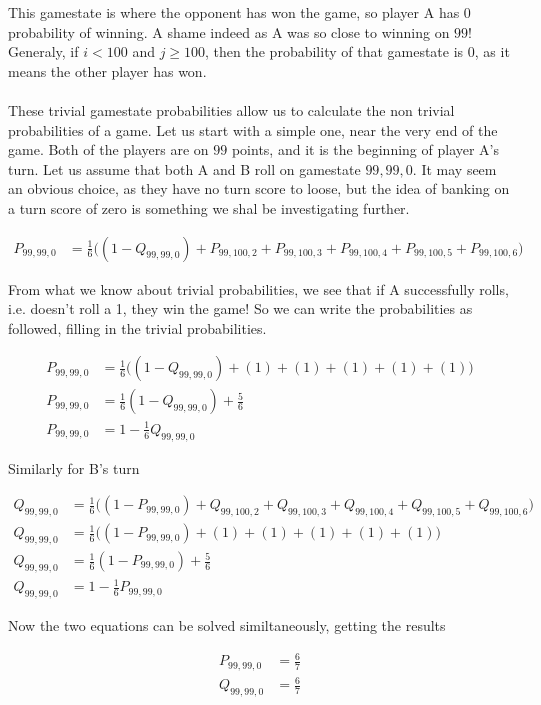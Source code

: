 \documentclass[a4paper,titlepage]{article}
\begin{document}
This gamestate is where the opponent has won the game, so player A has 0 probability of winning. A shame indeed as A was so close to winning on $99$!
Generaly, if $i<100$ and $j\geq100$, then the probability of that gamestate is $0$, as it means the other player has won.
\\
\\
These trivial gamestate probabilities allow us to calculate the non trivial probabilities of a game.
Let us start with a simple one, near the very end of the game. Both of the players are on $99$ points, and it is the beginning of player A's turn.
Let us assume that both A and B roll on gamestate $99,99,0$.
It may seem an obvious choice, as they have no turn score to loose, but the idea of banking on a turn score of zero is something we shal be investigating further.

\begin{align*}
	P_{99,99,0} &= \frac{1}{6}\bigg((1 - Q_{99,99,0}) + P_{99,100,2} + P_{99,100,3} + P_{99,100,4} + P_{99,100,5} + P_{99,100,6}\bigg)
\end{align*}

From what we know about trivial probabilities, we see that if A successfully rolls, i.e. doesn't roll a 1, they win the game!
So we can write the probabilities as followed, filling in the trivial probabilities.

\begin{align*}
	P_{99,99,0} &= \frac{1}{6}\bigg((1 - Q_{99,99,0}) + (1) + (1) + (1) + (1) + (1)\bigg)\\
	P_{99,99,0} &= \frac{1}{6}(1 - Q_{99,99,0})+\frac{5}{6}\\
	P_{99,99,0} &= 1 - \frac{1}{6}Q_{99,99,0}
\end{align*}

Similarly for B's turn

\begin{align*}
	Q_{99,99,0} &= \frac{1}{6}\bigg((1 - P_{99,99,0}) + Q_{99,100,2} + Q_{99,100,3} + Q_{99,100,4} + Q_{99,100,5} + Q_{99,100,6}\bigg)\\
	Q_{99,99,0} &= \frac{1}{6}\bigg((1 - P_{99,99,0}) + (1) + (1) + (1) + (1) + (1)\bigg)\\
	Q_{99,99,0} &= \frac{1}{6}(1 - P_{99,99,0})+\frac{5}{6}\\
	Q_{99,99,0} &= 1 - \frac{1}{6}P_{99,99,0}
\end{align*}

Now the two equations can be solved similtaneously, getting the results

\begin{align*}
	P_{99,99,0} &= \frac{6}{7}\\
	Q_{99,99,0} &= \frac{6}{7}
\end{align*}
\end{document}
